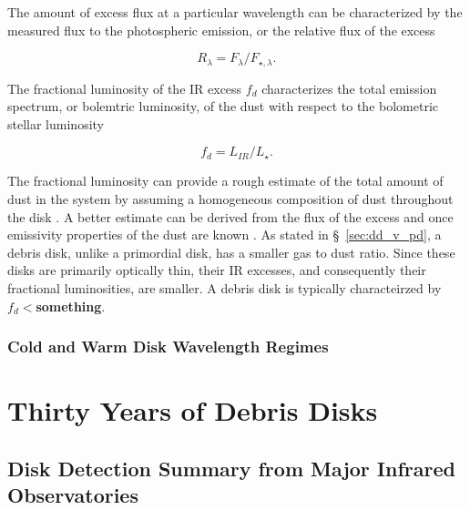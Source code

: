         The amount of excess flux at a particular wavelength can be characterized by the measured flux to the photospheric emission, or the relative flux of the excess
        
        \begin{equation}\label{eq:rel_excess}
        R_\lambda = F_\lambda / F_{\star,\lambda}.
        \end{equation}
        
        \noindent The fractional luminosity of the IR excess $f_d$ characterizes the total emission spectrum, or bolemtric luminosity, of the dust with respect to the bolometric stellar luminosity
        
        \begin{equation}\label{eq:rel_excess}
        f_d = L_{IR}/L_{\star}.
        \end{equation}
        
        \noindent The fractional luminosity can provide a rough estimate of the total amount of dust in the system by assuming a homogeneous composition of dust throughout the disk \citep{Wyatt2007}. A better estimate can be derived from the flux of the excess and once emissivity properties of the dust are known \citep{Beckwith2000}. As stated in \S~\ref{sec:dd_v_pd}, a debris disk, unlike a primordial disk, has a smaller gas to dust ratio. Since these disks are primarily optically thin, their IR excesses, and consequently their fractional luminosities, are smaller. A debris disk is typically characteirzed by \textbf{$f_d<$something}. 
        
        \subsubsection{Cold and Warm Disk Wavelength Regimes}
        
        
        
        
        
    \section{Thirty Years of Debris Disks}\label{sec:30years}
        
        
        
         

        \subsection{Disk Detection Summary from Major Infrared Observatories}\label{sec:IR_observatories}
        
